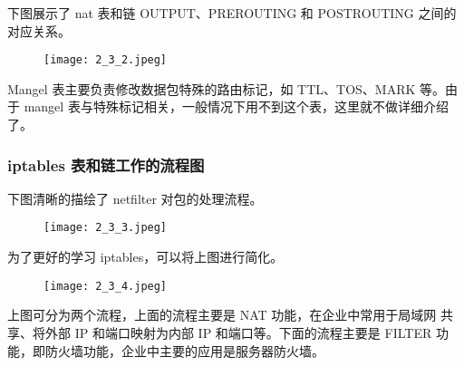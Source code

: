 下图展示了 nat 表和链 OUTPUT、PREROUTING 和 POSTROUTING 之间的对应关系。
\begin{figure}[H]
  \begin{center}
    \texttt{[image: 2\_3\_2.jpeg]}
  \end{center}
\end{figure}

Mangel 表主要负责修改数据包特殊的路由标记，如 TTL、TOS、MARK 等。由
于 mangel 表与特殊标记相关，一般情况下用不到这个表，这里就不做详细介绍
了。
%
\subsubsection{iptables 表和链工作的流程图}
下图清晰的描绘了 netfilter 对包的处理流程。
\begin{figure}[H]
  \begin{center}
    \texttt{[image: 2\_3\_3.jpeg]}
  \end{center}
\end{figure}

为了更好的学习 iptables，可以将上图进行简化。
\begin{figure}[H]
  \begin{center}
    \texttt{[image: 2\_3\_4.jpeg]}
  \end{center}
\end{figure}

上图可分为两个流程，上面的流程主要是 NAT 功能，在企业中常用于局域网
共享、将外部 IP 和端口映射为内部 IP 和端口等。下面的流程主要是 FILTER 功
能，即防火墙功能，企业中主要的应用是服务器防火墙。
